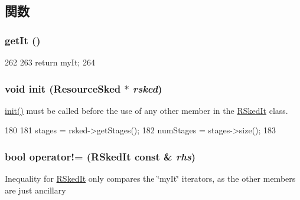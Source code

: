 \subsection{関数}
\hypertarget{classRSkedIt_a439650ab563a74697e9646155f2cb104}{
\subsubsection[{getIt}]{ getIt ()}}
\label{classRSkedIt_a439650ab563a74697e9646155f2cb104}



\begin{DoxyCode}
262     {
263         return myIt;
264     }
\end{DoxyCode}
\hypertarget{classRSkedIt_a4e0fbb4d6ed0a1241dd558720a96eaf7}{
\subsubsection[{init}]{\setlength{\rightskip}{0pt plus 5cm}void init ({\bf ResourceSked} $\ast$ {\em rsked})}}
\label{classRSkedIt_a4e0fbb4d6ed0a1241dd558720a96eaf7}
\hyperlink{classRSkedIt_a4e0fbb4d6ed0a1241dd558720a96eaf7}{init()} must be called before the use of any other member in the \hyperlink{classRSkedIt}{RSkedIt} class. 


\begin{DoxyCode}
180     {
181         stages = rsked->getStages();
182         numStages = stages->size();
183     }
\end{DoxyCode}
\hypertarget{classRSkedIt_af7fa11f330025f24da68814f87079e54}{
\subsubsection[{operator!=}]{\setlength{\rightskip}{0pt plus 5cm}bool operator!= ({\bf RSkedIt} const \& {\em rhs})}}
\label{classRSkedIt_af7fa11f330025f24da68814f87079e54}
Inequality for \hyperlink{classRSkedIt}{RSkedIt} only compares the \char`\"{}myIt\char`\"{} iterators, as the other members are just ancillary 


